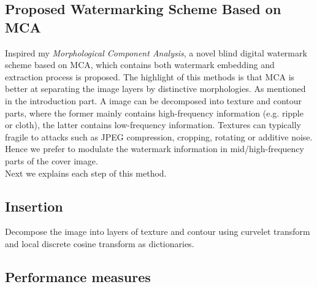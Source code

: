 \subsection{Proposed Watermarking Scheme Based on MCA}
Inspired my \textit{Morphological Component Analysis}, a novel blind digital watermark scheme based on MCA, which contains both watermark embedding and extraction process is proposed. The highlight of this methods is that MCA is better at separating the image layers by distinctive morphologies. As mentioned in the introduction part. A image can be decomposed into texture and contour parts, where the former mainly contains high-frequency information (e.g. ripple or cloth), the latter contains low-frequency information. Textures can typically fragile to attacks such as JPEG compression, cropping, rotating or additive noise.  Hence we prefer to modulate the watermark information in mid/high-frequency parts of the cover image.\\




Next we explains each step of this method.

\subsection{Insertion}
Decompose the image into layers of texture and contour using curvelet transform and local discrete cosine transform as dictionaries.



\subsection{Performance measures}
